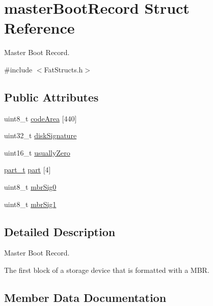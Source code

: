 \hypertarget{structmaster_boot_record}{}\section{master\+Boot\+Record Struct Reference}
\label{structmaster_boot_record}


Master Boot Record.  




{\ttfamily \#include $<$Fat\+Structs.\+h$>$}

\subsection*{Public Attributes}
\begin{DoxyCompactItemize}
\item 
uint8\+\_\+t \hyperlink{structmaster_boot_record_a26ca1fb4ebbff2cc1a54153b1dfcd688}{code\+Area} \mbox{[}440\mbox{]}
\item 
uint32\+\_\+t \hyperlink{structmaster_boot_record_a77151c641444c0653ff71a253f0423ef}{disk\+Signature}
\item 
uint16\+\_\+t \hyperlink{structmaster_boot_record_afacfc863e98f64053cd9459c6dec948f}{usually\+Zero}
\item 
\hyperlink{_fat_structs_8h_a37251e7d5c69a159be727a3fc8c9d0e6}{part\+\_\+t} \hyperlink{structmaster_boot_record_aa4e294e50f311635c10c92f4c99227c5}{part} \mbox{[}4\mbox{]}
\item 
uint8\+\_\+t \hyperlink{structmaster_boot_record_a42b0b413ecb21ac5314d4f6bca05308f}{mbr\+Sig0}
\item 
uint8\+\_\+t \hyperlink{structmaster_boot_record_aafbbcb4f6a2d1181c6458d4c9603df4f}{mbr\+Sig1}
\end{DoxyCompactItemize}


\subsection{Detailed Description}
Master Boot Record. 

The first block of a storage device that is formatted with a M\+B\+R. 

\subsection{Member Data Documentation}
\hypertarget{structmaster_boot_record_a26ca1fb4ebbff2cc1a54153b1dfcd688}{}
